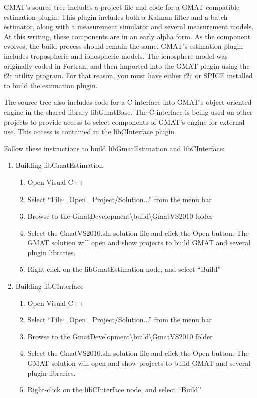\documentclass[letterpaper,10pt]{article}%
\begin{document}
{GMAT's source tree includes a project file and code for a GMAT compatible estimation plugin.  This plugin includes both a Kalman filter and a batch estimator, along with a measurement simulator and several measurement models.  At this writing, these components are in an early alpha form.  As the component evolves, the build process should remain the same.  GMAT's estimation plugin includes tropospheric and ionospheric models.  The ionosphere model was originally coded in Fortran, and then imported into the GMAT plugin using the f2c utility program.  For that reason, you must have either f2c or SPICE installed to build the estimation plugin.

The source tree also includes code for a C interface into GMAT's object-oriented engine in the shared library libGmatBase.  The C-interface is being used on other projects to provide access to select components of GMAT's engine for external use.  This access is contained in the libCInterface plugin.

Follow these instructions to build libGmatEstimation and libCInterface:

\begin{enumerate}
\item Building libGmatEstimation
\begin{enumerate}
\item Open Visual C++
\item Select ``File | Open | Project/Solution...'' from the menu bar
\item Browse to the GmatDevelopment\textbackslash build\textbackslash GmatVS2010 folder
\item Select the GmatVS2010.sln solution file and click the Open button.  The GMAT solution will open and show projects to build GMAT and several plugin libraries.
\item Right-click on the libGmatEstimation node, and select ``Build''
\end{enumerate}
\item Building libCInterface
\begin{enumerate}
\item Open Visual C++
\item Select ``File | Open | Project/Solution...'' from the menu bar
\item Browse to the GmatDevelopment\textbackslash build\textbackslash GmatVS2010 folder
\item Select the GmatVS2010.sln solution file and click the Open button.  The GMAT solution will open and show projects to build GMAT and several plugin libraries.
\item Right-click on the libCInterface node, and select ``Build''
\end{enumerate}
\end{enumerate}

}
\end{document}
